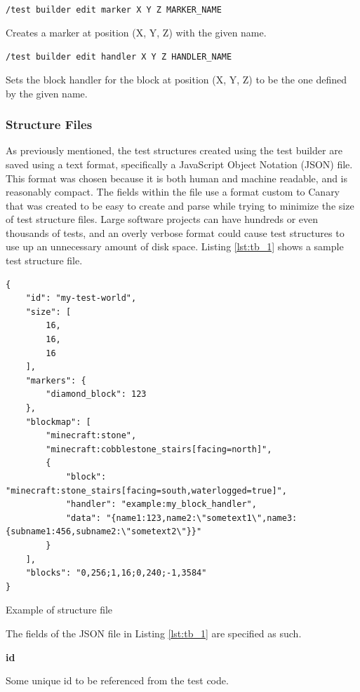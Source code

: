 \documentclass[12pt]{article}
\def\code#1{\texttt{#1}}
\newenvironment{longcode}{\captionsetup{type=listing}}{}
\begin{document}
\begin{onehalfspacing}
\noindent\code{/test builder edit marker X Y Z MARKER\_NAME}

Creates a marker at position (X, Y, Z) with the given name.

\noindent\code{/test builder edit handler X Y Z HANDLER\_NAME}

Sets the block handler for the block at position (X, Y, Z) to be the one
defined by the given name.

\subsubsection{Structure Files}

As previously mentioned, the test structures created using the test
builder are saved using a text format, specifically a JavaScript Object
Notation (JSON) file. This format was chosen because it is both human
and machine readable, and is reasonably compact. The fields within the
file use a format custom to Canary that was created to be easy to create
and parse while trying to minimize the size of test structure files.
Large software projects can have hundreds or even thousands of tests,
and an overly verbose format could cause test structures to use up an
unnecessary amount of disk space. Listing \ref{lst:tb_1} shows a sample test
structure file.


\begin{longcode}

\begin{verbatim}
{
    "id": "my-test-world",
    "size": [
        16,
        16,
        16
    ],
    "markers": {
        "diamond_block": 123
    },
    "blockmap": [
        "minecraft:stone",
        "minecraft:cobblestone_stairs[facing=north]",
        {
            "block": "minecraft:stone_stairs[facing=south,waterlogged=true]",
            "handler": "example:my_block_handler",
            "data": "{name1:123,name2:\"sometext1\",name3:{subname1:456,subname2:\"sometext2\"}}"
        }
    ],
    "blocks": "0,256;1,16;0,240;-1,3584"
}
\end{verbatim}
  \caption{Example of structure file}
  \label{lst:tb_1}
\end{longcode}

The fields of the JSON file in Listing \ref{lst:tb_1} are specified as such.

\noindent\textbf{id}

Some unique id to be referenced from the test code.


\end{onehalfspacing}
\end{document}
